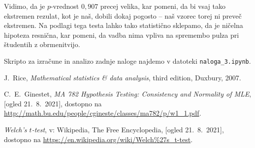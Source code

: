\documentclass[a4paper,11pt]{article}
\begin{document}
Vidimo, da je $p$-vrednost $0,907$ precej velika, kar pomeni, da bi vsaj tako ekstremen rezulat, kot je naš, dobili dokaj pogosto -- naš vzorec torej ni preveč ekstremen. Na podlagi tega testa lahko tako statistično sklepamo, da je ničelna hipoteza resnična, kar pomeni, da vadba nima vpliva na spremembo pulza pri študentih z obrmenitvijo.

Skripto za izračune in analizo zadnje naloge najdemo v datoteki \linebreak \texttt{naloga\_3.ipynb}.

\begin{thebibliography}{99}

    J.~Rice, \emph{Mathematical statistics \& data analysis}, third edition, Duxbury, 2007.

    C.~E.~Ginestet, \emph{MA 782 Hypothesis Testing: Consistency and Normality of MLE}, [ogled 21.~8.~2021], dostopno na \url{http://math.bu.edu/people/cgineste/classes/ma782/p/w1_1.pdf}.

    \emph{Welch's $t$-test}, v: Wikipedia, The Free Encyclopedia, [ogled 21.~8.~2021], dostopno na \url{https://en.wikipedia.org/wiki/Welch%27s_t-test}.
    
\end{thebibliography}
\end{document}
